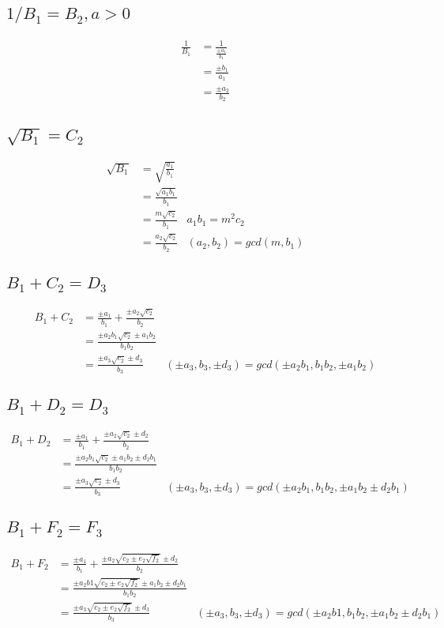 \documentclass{article}
\begin{document}
\subsection{$1 / B_1 = B_2, a > 0$}
\begin{align*}
\frac{1}{B_1} &= \frac{1}{\frac{\pm a_1}{b_1}}\\
 &= \frac{\pm b_1}{a_1} \\
 &= \frac{\pm a_2}{b_2}
\end{align*}

\subsection{$\sqrt{B_1} = C_2$}
\begin{align*}
\sqrt{B_1} &= \sqrt{\frac{a_1}{b_1}}\\
  &= \frac{\sqrt{a_1b_1}}{b_1}\\
  &= \frac{m\sqrt{c_2}}{b_1}    & a_1b_1 = m^2c_2\\
  &= \frac{a_2\sqrt{c_2}}{b_2}  & (a_2, b_2) = gcd(m, b_1)
\end{align*}

\subsection{$B_1 + C_2 = D_3$}
\begin{align*}
B_1 + C_2 &= \frac{\pm a_1}{b_1} + \frac{\pm a_2\sqrt{c_2}}{b_2}\\
 &= \frac{\pm a_2b_1\sqrt{c_2} \pm a_1b_2 }{b_1b_2}\\
 &= \frac{\pm a_3\sqrt{c_2} \pm d_3 }{b_3} & (\pm a_3, b_3, \pm d_3) = gcd(\pm a_2b_1,b_1b_2,\pm a_1b_2)
\end{align*}

\subsection{$B_1 + D_2 = D_3$}
\begin{align*}
B_1 + D_2 &= \frac{\pm a_1}{b_1} + \frac{\pm a_2\sqrt{c_2} \pm d_2}{b_2}\\
 &= \frac{\pm a_2b_1\sqrt{c_2} \pm a_1b_2 \pm d_2b_1 }{b_1b_2}\\
 &= \frac{\pm a_3\sqrt{c_2} \pm d_3 }{b_3} & (\pm a_3, b_3, \pm d_3) = gcd(\pm a_2b_1,b_1b_2,\pm a_1b_2 \pm d_2b_1)
\end{align*}

\subsection{$B_1 + F_2 = F_3$} %
\begin{align*}
B_1 + F_2 &= \frac{\pm a_1}{b_1} + \frac{\pm a_2\sqrt{c_2 \pm e_2\sqrt{f_2}} \pm d_2}{b_2}\\
 &= \frac{\pm a_2b1\sqrt{c_2 \pm e_2\sqrt{f_2}} \pm a_1b_2 \pm d_2b_1}{b_1b_2}\\
 &= \frac{\pm a_3\sqrt{c_2 \pm e_2\sqrt{f_2}} \pm d_3}{b_3} & (\pm a_3, b_3, \pm d_3)=gcd(\pm a_2b1,b_1b_2,\pm a_1b_2 \pm d_2b_1)
\end{align*}
\end{document}
